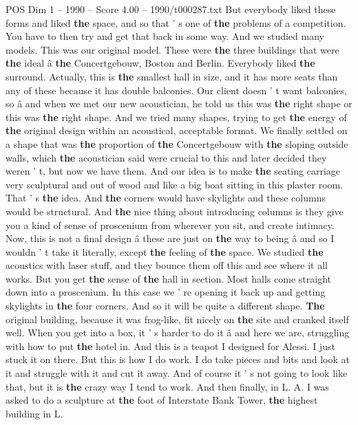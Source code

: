 \begin{textsample}{POS Dim 1 – 1990 – Score 4.00 – 1990/t000287.txt}
But everybody liked these forms and liked \textbf{the} space, and so that ' s one of \textbf{the} problems of a competition.
You have to then try and get that back in some way.
And we studied many models.
This was our original model.
These were \textbf{the} three buildings that were \textbf{the} ideal â \textbf{the} Concertgebouw, Boston and Berlin.
Everybody liked \textbf{the} surround.
Actually, this is \textbf{the} smallest hall in size, and it has more seats than any of these because it has double balconies.
Our client doesn ' t want balconies, so â and when we met our new acoustician, he told us this was \textbf{the} right shape or this was \textbf{the} right shape.
And we tried many shapes, trying to get \textbf{the} energy of \textbf{the} original design within an acoustical, acceptable format.
We finally settled on a shape that was \textbf{the} proportion of \textbf{the} Concertgebouw with \textbf{the} sloping outside walls, which \textbf{the} acoustician said were crucial to this and later decided they weren ' t, but now we have them.
And our idea is to make \textbf{the} seating carriage very sculptural and out of wood and like a big boat sitting in this plaster room.
That ' s \textbf{the} idea.
And \textbf{the} corners would have skylights and these columns would be structural.
And \textbf{the} nice thing about introducing columns is they give you a kind of sense of proscenium from wherever you sit, and create intimacy.
Now, this is not a final design â these are just on \textbf{the} way to being â and so I wouldn ' t take it literally, except \textbf{the} feeling of \textbf{the} space.
We studied \textbf{the} acoustics with laser stuff, and they bounce them off this and see where it all works.
But you get \textbf{the} sense of \textbf{the} hall in section.
Most halls come straight down into a proscenium.
In this case we ' re opening it back up and getting skylights in \textbf{the} four corners.
And so it will be quite a different shape. \textbf{The} original building, because it was frog-like, fit nicely on \textbf{the} site and cranked itself well.
When you get into a box, it ' s harder to do it â and here we are, struggling with how to put \textbf{the} hotel in.
And this is a teapot I designed for Alessi.
I just stuck it on there.
But this is how I do work.
I do take pieces and bits and look at it and struggle with it and cut it away.
And of course it ' s not going to look like that, but it is \textbf{the} crazy way I tend to work.
And then finally, in L.
A.
I was asked to do a sculpture at \textbf{the} foot of Interstate Bank Tower, \textbf{the} highest building in L.

\end{textsample}
